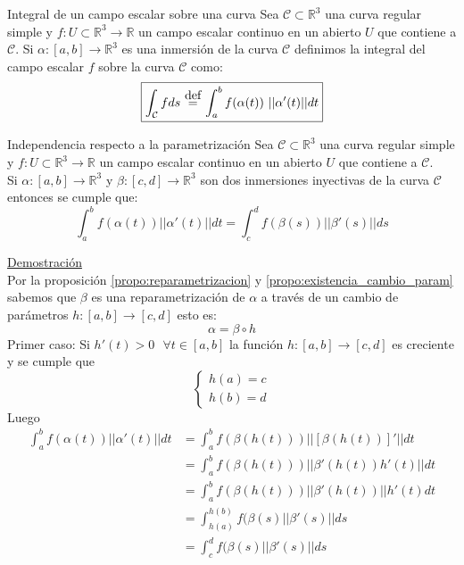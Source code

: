 \documentclass{report}
\newcommand\defeq{\stackrel{\mathclap{\normalfont\mbox{def}}}{~=~}}
\newcommand\reals{\mathds{R}}
\begin{document}
\begin{defbox}{Integral de un campo escalar sobre una curva}
	Sea $\mathcal{C}\subset\reals^3$ una curva regular simple y $f: U \subset \reals^3 \rightarrow \reals$ un campo escalar continuo en un abierto $U$ que contiene a $\mathcal{C}$. Si $\alpha : [a,b] \rightarrow \reals^3$ es una inmersión de la curva $\mathcal{C}$ definimos la integral del campo escalar $f$ sobre la curva $\mathcal{C}$ como:
	\begin{equation}
		\boxed{\int_{\mathcal{C}}{fds}\defeq \int_a^b{f(\alpha (t)) ~||\alpha '(t) ||dt}}
		\label{eq:int_c_f}
	\end{equation}
\end{defbox}

\begin{teobox}{Independencia respecto a la parametrización}
	Sea $\mathcal{C} \subset \reals^3$ una curva regular simple y $f: U \subset \reals^3 \rightarrow \reals$ un campo escalar continuo en un abierto $U$ que contiene a $\mathcal{C}$. \\
	Si $\alpha :[a,b] \rightarrow \reals^3$ y $\beta : [c,d] \rightarrow \reals^3$ son dos inmersiones inyectivas de la curva $\mathcal{C}$ entonces se cumple que: \\
	\[
		\int_a^b{f(\alpha (t))||\alpha '(t)||dt} = \int_c^d{f(\beta (s))||\beta '(s)||ds}
	\]
	\tcblower
\end{teobox}
\underline{Demostración} \\
Por la proposición \ref{propo:reparametrizacion} y \ref{propo:existencia_cambio_param} sabemos que $\beta$ es una reparametrización de $\alpha$ a través de un cambio de parámetros $h: [a,b] \rightarrow [c,d]$ esto es: \\
\[
	\alpha = \beta \circ h
\]
Primer caso: Si $h'(t) > 0 ~~~ \forall t \in [a,b]$ la función $h: [a,b] \rightarrow [c,d]$ es creciente y se cumple que
\[
	\left\{ \begin{array}{l}
		h(a) = c \\
		h(b) = d
	\end{array} \right.
\]
Luego \\
\[
	\begin{array}{ll}
		\int_a^b{f(\alpha (t)) ||\alpha '(t)||dt} & = \int_a^b{f(\beta (h(t))) ||[\beta (h(t))]'||dt}    \\
		                                          & = \int_a^b{f(\beta (h(t))) ||\beta '(h(t))h'(t)||dt} \\
		                                          & = \int_a^b{f(\beta (h(t))) ||\beta '(h(t))||h'(t)dt} \\
		                                          & = \int_{h(a)}^{h(b)}{f(\beta (s) ||\beta '(s)||ds}   \\
		                                          & = \int_{c}^{d}{f(\beta (s) ||\beta '(s)||ds}         \\
	\end{array}
\]
\end{document}
